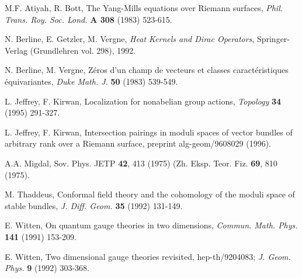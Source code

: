 \documentclass[12pt]{article}
\begin{document}
\noindent{\bf [AB]} M.F. Atiyah, R. Bott, The Yang-Mills equations
over Riemann surfaces, {\em Phil. Trans. Roy. Soc. Lond.} {\bf A 308}
(1983) 523-615.

\noindent{\bf [BGV]}  N. Berline, E. Getzler, M. Vergne, 
{\it Heat Kernels  and Dirac Operators}, Springer-Verlag
(Grundlehren vol. 298), 1992.

\noindent{\bf [BV]} N. Berline, M. Vergne, Z\'eros d'un
champ de vecteurs et classes caract\'eristiques
\'equivariantes, {\em Duke Math. J.}
{\bf 50} (1983) 539-549.
\smallskip

\noindent{\bf [JK1]} L. Jeffrey, F. Kirwan, Localization for nonabelian group 
actions, {\it Topology} {\bf 34} (1995) 291-327.

\noindent{\bf [JK2]} L. Jeffrey, F. Kirwan, Intersection pairings in 
moduli spaces of vector bundles of arbitrary rank over a Riemann
surface, preprint alg-geom/9608029 (1996).

\smallskip
\noindent{\bf [M] } 
A.A. Migdal, Sov. Phys. JETP {\bf 42}, 413 (1975) (Zh. Eksp. Teor.
Fiz. {\bf 69}, 810 (1975).

\smallskip
\noindent{\bf [T]} M. Thaddeus, Conformal field theory and the cohomology
of the moduli space of stable bundles, {\em J. Diff. Geom.} 
{\bf 35} (1992) 131-149.

\smallskip
\noindent{\bf [W1]} E. Witten, On quantum gauge theories in two dimensions,
{\em Commun. Math. Phys.} {\bf 141} (1991) 153-209.
\smallskip

\noindent{\bf [W2]} E. Witten, Two dimensional gauge theories revisited,
hep-th/9204083;
{\em J. Geom. Phys.} {\bf 9} (1992) 303-368.
\end{document}
